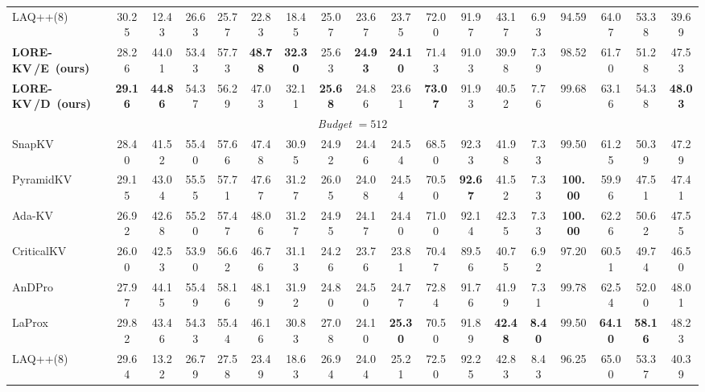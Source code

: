 \documentclass{article} %
\newcommand{\best}[1]{\textcolor{bestblue}{\textbf{#1}}}
\newcommand{\second}[1]{\textcolor{secondorange}{#1}}
\newcommand{\lorekvE}{LORE-KV\,/E}
\newcommand{\lorekvD}{LORE-KV\,/D}
\begin{document}
\begin{table}[t]
{\begin{tabular}{lccccccccccccccccc}
LAQ++(8)
& 30.25 & 12.43 & 26.63 & 25.77 & 22.83 & 18.45
& 25.07 & 23.67 & 23.75 & 72.00 & 91.97 & 43.17
& 6.93 & 94.59 & 64.07 & 53.38 & 39.69 \\

\textbf{\lorekvE\ (ours)}
& 28.26 & \second{44.01} & 53.43 & \second{57.73}
& \best{48.78} & \best{32.30} & \second{25.63}
& \best{24.93} & \best{24.10} & 71.43 & 91.03
& 39.98 & 7.39 & 98.52 & 61.70 & 51.28
& \second{47.53} \\

\textbf{\lorekvD\ (ours)}
& \best{29.16} & \best{44.86} & 54.37 & 56.29 & 47.03
& \second{32.11} & \best{25.68} & \second{24.86}
& 23.61 & \best{73.07} & 91.93 & 40.52
& 7.76 & 99.68 & \second{63.16} & \second{54.38}
& \best{48.03} \\


\midrule
\multicolumn{18}{c}{\textit{Budget} $=512$} \\
\midrule
SnapKV
& 28.40 & 41.52 & 55.40 & 57.66 & 47.48 & 30.95
& 24.92 & 24.46 & 24.54 & 68.50 & \second{92.33}
& 41.98 & 7.33 & 99.50 & 61.25 & 50.39 & 47.29 \\

PyramidKV
& 29.15 & 43.04 & \second{55.55} & 57.71 & 47.67
& 31.27 & 26.05 & 24.08 & 24.54 & 70.50
& \best{92.67} & 41.52 & 7.33 & \best{100.00}
& 59.96 & 47.51 & 47.41 \\

Ada-KV
& 26.92 & 42.68 & 55.20 & 57.47 & 48.06 & 31.27
& 24.95 & 24.17 & 24.40 & 71.00 & 92.14
& \second{42.35} & 7.33 & \best{100.00}
& 62.26 & 50.62 & 47.55 \\

CriticalKV
& 26.00 & 42.53 & 53.90 & 56.62 & 46.76 & 31.13
& 24.26 & 23.76 & 23.81 & 70.47 & 89.56 & 40.75
& 6.92 & 97.20 & 60.51 & 49.74 & 46.50 \\

AnDPro
& 27.97 & \second{44.15} & 55.49 & \second{58.16}
& \second{48.19} & 31.92 & 24.80 & 24.50 & 24.77
& \second{72.84} & 91.76 & 41.99 & 7.31
& \second{99.78} & \second{62.54} & 52.00 & 48.01 \\

LaProx
& \second{29.82} & 43.46 & 54.33 & 55.44 & 46.16 & 30.83
& 27.08 & 24.10 & \best{25.30} & 70.50 & 91.89
& \best{42.48} & \best{8.40} & 99.50
& \best{64.10} & \best{58.16} & \second{48.23} \\

LAQ++(8)
& 29.64 & 13.22 & 26.79 & 27.58 & 23.49 & 18.63
& 26.94 & 24.04 & 25.21 & 72.50 & 92.25 & 42.83
& 8.43 & 96.25 & 65.00 & 53.37 & 40.39 \\


\end{tabular}}
\end{table}
\end{document}
